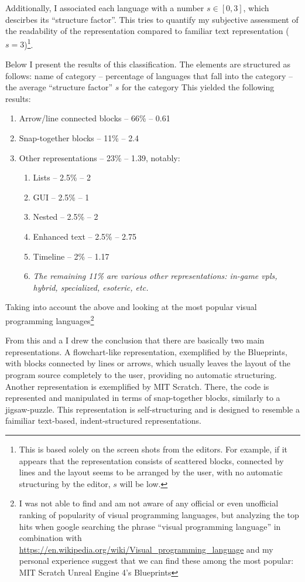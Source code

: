 Additionally, I associated each language with a number $s \in [0, 3]$, which
descirbes its ``structure factor''. This tries to quantify my subjective
assessment of the readability of the representation compared to familiar text
representation ($s = 3$)\footnote{This is based solely on the screen shots from
  the editors. For example, if it appears that the representation consists of
  scattered blocks, connected by lines and the layout seems to be arranged by
  the user, with no automatic structuring by the editor, $s$ will be low.}.

Below I present the results of this classification. The elements are structured
as follows: name of category -- percentage of languages that fall into the
category -- the average ``structure factor'' $s$ for the category This yielded
the following results:
\begin{enumerate}
    \item Arrow/line connected blocks -- 66\% -- 0.61
    \item Snap-together blocks -- 11\% -- 2.4
    \item Other representations -- 23\% -- 1.39, notably:
    \begin{enumerate}
        \item Lists -- 2.5\% -- 2
        \item GUI -- 2.5\% -- 1
        \item Nested -- 2.5\% -- 2
        \item Enhanced text -- 2.5\% -- 2.75
        \item Timeline -- 2\% -- 1.17
        \item \textit{The remaining 11\% are various other representations:
          in-game \acrshort{vpl}s, hybrid, specialized, esoteric, etc.}
    \end{enumerate}
\end{enumerate}

Taking into account the above and looking at the most popular visual programming
languages\footnote{I was not able to find and am not aware of any official or
  even unofficial ranking of popularity of visual programming languages, but
  analyzing the top hits when google searching the phrase ``visual programming
  language'' in combination with
  \url{https://en.wikipedia.org/wiki/Visual_programming_language} and my
  personal experience suggest that we can find these among the most popular: MIT
  Scratch Unreal Engine 4's Blueprints}

From this and a I drew the conclusion that there are basically two main
representations. A flowchart-like representation, exemplified by the Blueprints,
with blocks connected by lines or arrows, which usually leaves the layout of the
program source completely to the user, providing no automatic
structuring. Another representation is exemplified by MIT Scratch. There, the
code is represented and manipulated in terms of snap-together blocks, similarly
to a jigsaw-puzzle. This representation is self-structuring and is designed to
resemble a faimiliar text-based, indent-structured representations.

